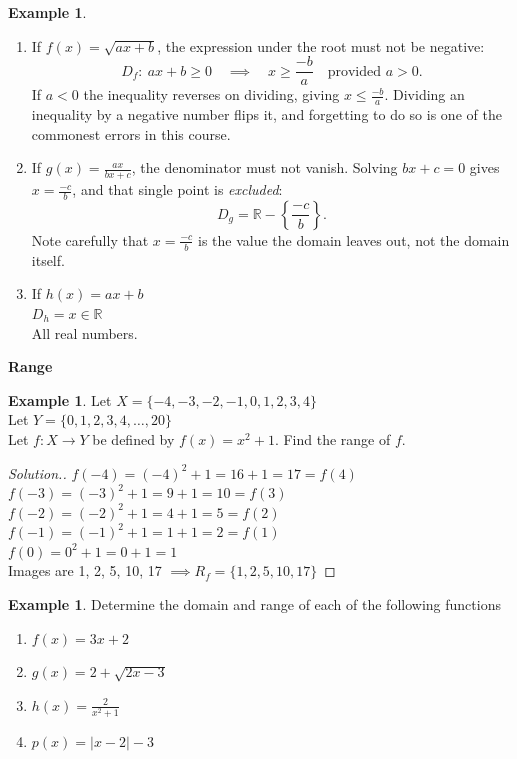 \documentclass[11pt,a4paper]{article}
\theoremstyle{definition}
\newtheorem{example}[thm]{Example}
\newenvironment{solution}
  {\renewcommand{\qedsymbol}{}\begin{proof}[\textit{Solution}.]}
  {\end{proof}}
\begin{document}
\begin{example}

\begin{enumerate}
\item If $f(x)=\sqrt{ax+b}$, the expression under the root must not be negative:
$$D_f:\ ax+b\geq 0 \quad \implies\quad  x\geq\frac{-b}{a}
\quad \text{provided } a>0 .$$
If $a<0$ the inequality reverses on dividing, giving $x\leq\frac{-b}{a}$. Dividing
an inequality by a negative number flips it, and forgetting to do so is one of the
commonest errors in this course.

\item If $g(x)=\frac{ax}{bx+c}$, the denominator must not vanish. Solving
$bx+c=0$ gives $x=\frac{-c}{b}$, and that single point is \emph{excluded}:
$$D_g=\mathbb{R}-\left\{\frac{-c}{b}\right\}.$$
Note carefully that $x=\frac{-c}{b}$ is the value the domain leaves out, not the
domain itself.\\

\item If $h(x)=ax+b$\\

$D_h=x\in \mathbb{R}$\\
All real numbers.\\
\end{enumerate}



\textbf{Range}
\end{example}
\begin{example}

Let $X=\{-4,-3,-2,-1,0,1,2,3,4\}$\\

Let $Y=\{0,1,2,3,4,\ldots, 20\}$\\

Let $f:X\longrightarrow Y$ be defined by $f(x)=x^2+1$. Find the range of $f$.
\end{example}
\begin{solution}

$f(-4)=(-4)^2+1=16+1=17=f(4)$\\

$f(-3)=(-3)^2+1=9+1=10=f(3)$\\

$f(-2)=(-2)^2+1=4+1=5=f(2)$\\

$f(-1)=(-1)^2+1=1+1=2=f(1)$\\

$f(0)=0^2+1=0+1=1$\\


Images are 1, 2, 5, 10, 17 $\implies R_f=\{1,2,5,10,17\}$
\end{solution}
\begin{example}

Determine the domain and range of each of the following functions
\begin{enumerate}
\item $f(x)=3x+2$
\item $g(x)=2+\sqrt{2x-3}$
\item $h(x)=\frac{2}{x^2+1}$
\item $p(x)=|x-2|-3$
\end{enumerate}
\end{example}
\end{document}
